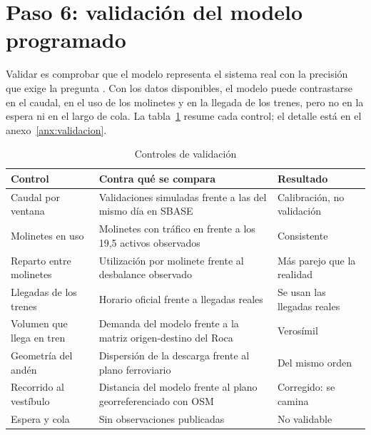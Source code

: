 \section{Paso 6: validación del modelo programado}
\label{sec:paso6-validacion}

Validar es comprobar que el modelo representa el sistema real con la precisión que exige la pregunta
\parencite{law2015}. Con los datos disponibles, el modelo puede contrastarse en el caudal, en el uso de los
molinetes y en la llegada de los trenes, pero no en la espera ni en el largo de cola. La
tabla~\ref{tab:validacion} resume cada control; el detalle está en el anexo~\ref{anx:validacion}.

\begin{table}[H]
\centering
\caption{Controles de validación}
\label{tab:validacion}
\small
\begin{tabularx}{\textwidth}{@{}>{\raggedright\arraybackslash}p{3.3cm} X >{\raggedright\arraybackslash}p{2.6cm}@{}}
\toprule
Control & Contra qué se compara & Resultado \\
\midrule
Caudal por ventana & Validaciones simuladas frente a las del mismo día en SBASE & Calibración, no validación \\
Molinetes en uso & Molinetes con tráfico en \EO{} frente a los 19,5 activos observados & Consistente \\
Reparto entre molinetes & Utilización por molinete frente al desbalance observado & Más parejo que la realidad \\
Llegadas de los trenes & Horario oficial frente a llegadas reales & Se usan las llegadas reales \\
Volumen que llega en tren & Demanda del modelo frente a la matriz origen-destino del Roca & Verosímil \\
Geometría del andén & Dispersión de la descarga frente al plano ferroviario & Del mismo orden \\
Recorrido al vestíbulo & Distancia del modelo frente al plano georreferenciado con OSM & Corregido: se camina \\
Espera y cola & Sin observaciones publicadas & No validable \\
\bottomrule
\end{tabularx}
\end{table}

